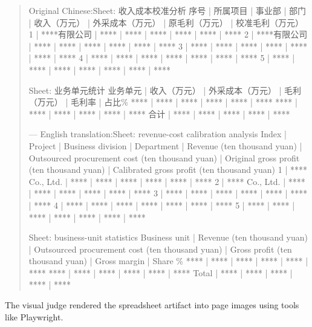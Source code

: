 \documentclass[11pt, a4paper, copyright, frontis]{frontis}
\newenvironment{casebox}{%
  \begin{quote}%
  \setlength{\parindent}{0pt}%
  \setlength{\parskip}{0pt}%
}{%
  \end{quote}%
}
\newenvironment{caselines}{%
  \begingroup
  \parindent0pt
  \parskip0pt
  \obeylines
  \obeyspaces
}{%
  \endgroup
}
\begin{document}
\begin{casebox}\scriptsize\raggedright
\begin{caselines}
Original Chinese:\nopagebreak[4]
Sheet: 收入成本校准分析
序号 | 所属项目 | 事业部 | 部门 | 收入（万元） | 外采成本（万元） | 原毛利（万元） | 校准毛利（万元）
1 | ****有限公司 | **** | **** | **** | **** | **** | ****
2 | ****有限公司 | **** | **** | **** | **** | **** | ****
3 | **** | **** | **** | **** | **** | **** | ****
4 | **** | **** | **** | **** | **** | **** | ****
5 | **** | **** | **** | **** | **** | **** | ****

Sheet: 业务单元统计
业务单元 | 收入（万元） | 外采成本（万元） | 毛利（万元） | 毛利率 | 占比\%
**** | **** | **** | **** | **** | ****
**** | **** | **** | **** | **** | ****
合计 | **** | **** | **** | **** | ****

---
English translation:\nopagebreak[4]
Sheet: revenue-cost calibration analysis
Index | Project | Business division | Department | Revenue (ten thousand yuan) | Outsourced procurement cost (ten thousand yuan) | Original gross profit (ten thousand yuan) | Calibrated gross profit (ten thousand yuan)
1 | **** Co., Ltd. | **** | **** | **** | **** | **** | ****
2 | **** Co., Ltd. | **** | **** | **** | **** | **** | ****
3 | **** | **** | **** | **** | **** | **** | ****
4 | **** | **** | **** | **** | **** | **** | ****
5 | **** | **** | **** | **** | **** | **** | ****

Sheet: business-unit statistics
Business unit | Revenue (ten thousand yuan) | Outsourced procurement cost (ten thousand yuan) | Gross profit (ten thousand yuan) | Gross margin | Share \%
**** | **** | **** | **** | **** | ****
**** | **** | **** | **** | **** | ****
Total | **** | **** | **** | **** | ****
\end{caselines}
\end{casebox}
The visual judge rendered the spreadsheet artifact into page images using tools like Playwright. 
\end{document}
